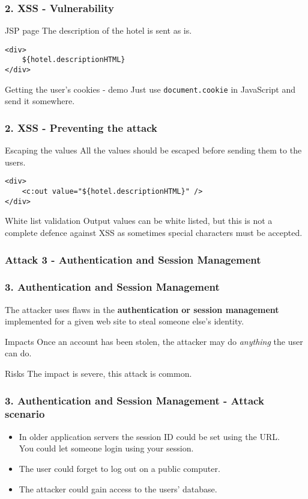 \begin{frame}[fragile]
\frametitle{2. XSS - Vulnerability}
\begin{exampleblock}{JSP page}
The description of the hotel is sent as is.
\begin{lstlisting}
<div>
	${hotel.descriptionHTML}
</div>
\end{lstlisting}
\end{exampleblock}
\pause
\begin{exampleblock}{Getting the user's cookies - demo}
Just use \lstinline!document.cookie! in JavaScript and send it somewhere.
\end{exampleblock}
\end{frame}

\begin{frame}[fragile]
\frametitle{2. XSS - Preventing the attack}
\begin{block}{Escaping the values}
All the values should be escaped before sending them to the users.
\begin{lstlisting}
<div>
	<c:out value="${hotel.descriptionHTML}" />
</div>
\end{lstlisting}
\end{block}
\begin{block}{White list validation}
Output values can be white listed, but this is not a complete defence against
XSS as sometimes special characters must be accepted.
\end{block}
\end{frame}

\subsubsection{Attack 3 - Authentication and Session Management}

\begin{frame}
\frametitle{3. Authentication and Session Management}
The attacker uses flaws in the \textbf{authentication or session management}
implemented for a given web site to steal someone else's identity.
\begin{block}{Impacts}
Once an account has been stolen, the attacker may do \emph{anything} the user
can do.
\end{block}
\begin{block}{Risks}
The impact is \alert{severe}, this attack is common.
\end{block}
\end{frame}

\begin{frame}
\frametitle{3. Authentication and Session Management - Attack scenario}
\begin{itemize}
\item In older application servers the session ID could be set using the URL.
	\\ You could let someone login using your session.
\item The user could forget to log out on a public computer.
\item The attacker could gain access to the users' database.
\end{itemize}
\end{frame}

